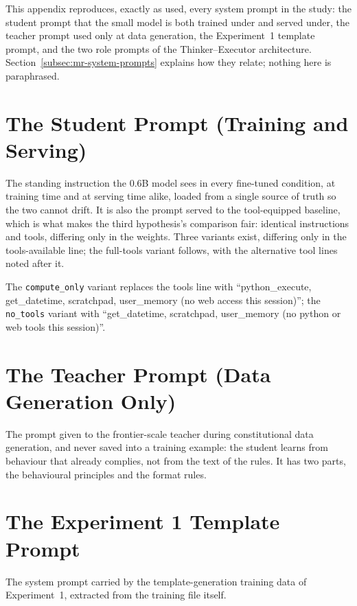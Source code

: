 This appendix reproduces, exactly as used, every system prompt in the study: the student prompt that the small model is both trained under and served under, the teacher prompt used only at data generation, the Experiment~1 template prompt, and the two role prompts of the Thinker--Executor architecture. Section~\ref{subsec:mr-system-prompts} explains how they relate; nothing here is paraphrased.

\section{The Student Prompt (Training and Serving)}
The standing instruction the 0.6B model sees in every fine-tuned condition, at training time and at serving time alike, loaded from a single source of truth so the two cannot drift. It is also the prompt served to the tool-equipped baseline, which is what makes the third hypothesis's comparison fair: identical instructions and tools, differing only in the weights. Three variants exist, differing only in the tools-available line; the full-tools variant follows, with the alternative tool lines noted after it.



The \texttt{compute\_only} variant replaces the tools line with ``python\_execute, get\_datetime, scratchpad, user\_memory (no web access this session)''; the \texttt{no\_tools} variant with ``get\_datetime, scratchpad, user\_memory (no python or web tools this session)''.

\section{The Teacher Prompt (Data Generation Only)}
The prompt given to the frontier-scale teacher during constitutional data generation, and never saved into a training example: the student learns from behaviour that already complies, not from the text of the rules. It has two parts, the behavioural principles and the format rules.





\section{The Experiment 1 Template Prompt}
The system prompt carried by the template-generation training data of Experiment~1, extracted from the training file itself.

